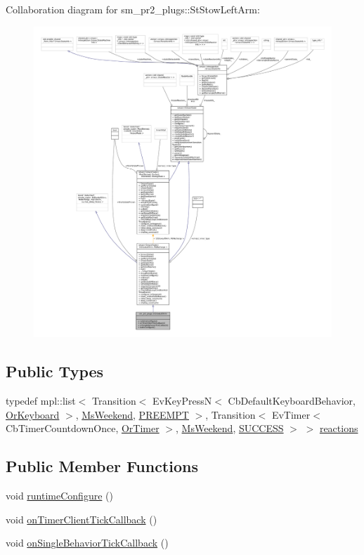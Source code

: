 Collaboration diagram for sm\+\_\+pr2\+\_\+plugs\+:\+:St\+Stow\+Left\+Arm\+:
\nopagebreak
\begin{figure}[H]
\begin{center}
\leavevmode
\includegraphics[width=350pt]{structsm__pr2__plugs_1_1StStowLeftArm__coll__graph}
\end{center}
\end{figure}
\subsection*{Public Types}
\begin{DoxyCompactItemize}
\item 
typedef mpl\+::list$<$ Transition$<$ Ev\+Key\+PressN$<$ Cb\+Default\+Keyboard\+Behavior, \hyperlink{classsm__pr2__plugs_1_1OrKeyboard}{Or\+Keyboard} $>$, \hyperlink{classsm__pr2__plugs_1_1MsWeekend}{Ms\+Weekend}, \hyperlink{classPREEMPT}{P\+R\+E\+E\+M\+PT} $>$, Transition$<$ Ev\+Timer$<$ Cb\+Timer\+Countdown\+Once, \hyperlink{classsm__pr2__plugs_1_1OrTimer}{Or\+Timer} $>$, \hyperlink{classsm__pr2__plugs_1_1MsWeekend}{Ms\+Weekend}, \hyperlink{classSUCCESS}{S\+U\+C\+C\+E\+SS} $>$ $>$ \hyperlink{structsm__pr2__plugs_1_1StStowLeftArm_a571756481c6a56baae36fbef1ba400c5}{reactions}
\end{DoxyCompactItemize}
\subsection*{Public Member Functions}
\begin{DoxyCompactItemize}
\item 
void \hyperlink{structsm__pr2__plugs_1_1StStowLeftArm_af3124c3f8bc9a03f7af8c49dd0469856}{runtime\+Configure} ()
\item 
void \hyperlink{structsm__pr2__plugs_1_1StStowLeftArm_a9a93ba44d99b53a4800aeae059ea5bc4}{on\+Timer\+Client\+Tick\+Callback} ()
\item 
void \hyperlink{structsm__pr2__plugs_1_1StStowLeftArm_ac59caffbdba0918475f0778081742b40}{on\+Single\+Behavior\+Tick\+Callback} ()
\end{DoxyCompactItemize}
